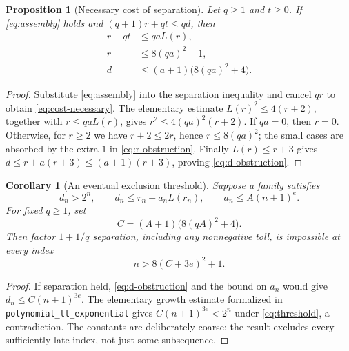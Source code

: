 \documentclass[11pt]{article}
\newtheorem{proposition}[theorem]{Proposition}
\newtheorem{corollary}[theorem]{Corollary}
\theoremstyle{definition}
\theoremstyle{remark}
\begin{document}
\begin{proposition}[Necessary cost of separation]\label{prop:cost}
Let $q\ge1$ and $t\ge0$. If \eqref{eq:assembly} holds and
$(q+1)r+qt\le qd$, then
\begin{align}
 r+qt&\le qaL(r),\label{eq:cost-necessary}\\
 r&\le8(qa)^2+1,\label{eq:r-obstruction}\\
 d&\le(a+1)\bigl(8(qa)^2+4\bigr).\label{eq:d-obstruction}
\end{align}
\end{proposition}
\begin{proof}
Substitute \eqref{eq:assembly} into the separation inequality and cancel
$qr$ to obtain \eqref{eq:cost-necessary}. The elementary estimate
$L(r)^2\le4(r+2)$, together with $r\le qaL(r)$, gives
$r^2\le4(qa)^2(r+2)$. If $qa=0$, then $r=0$. Otherwise, for $r\ge2$
we have $r+2\le2r$, hence $r\le8(qa)^2$; the small cases are absorbed
by the extra $1$ in \eqref{eq:r-obstruction}. Finally $L(r)\le r+3$ gives
$d\le r+a(r+3)\le(a+1)(r+3)$, proving \eqref{eq:d-obstruction}.
\end{proof}

\begin{corollary}[An eventual exclusion threshold]\label{cor:exclude}
Suppose a family satisfies
\[
 d_n>2^n,\qquad d_n\le r_n+a_nL(r_n),\qquad
 a_n\le A(n+1)^e.
\]
For fixed $q\ge1$, set
\[
 C=(A+1)\bigl(8(qA)^2+4\bigr).
\]
Then factor $1+1/q$ separation, including any nonnegative toll, is impossible
at every index
\begin{equation}\label{eq:threshold}
 n>8(C+3e)^2+1.
\end{equation}
\end{corollary}
\begin{proof}
If separation held, \eqref{eq:d-obstruction} and the bound on $a_n$ would give
$d_n\le C(n+1)^{3e}$. The elementary growth estimate formalized in
\texttt{polynomial\_lt\_exponential} gives
$C(n+1)^{3e}<2^n$ under \eqref{eq:threshold}, a contradiction. The
constants are deliberately coarse; the result excludes every sufficiently
late index, not just some subsequence.
\end{proof}
\end{document}
